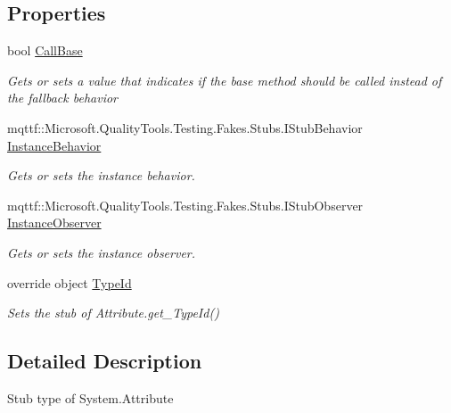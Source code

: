 \subsection*{Properties}
\begin{DoxyCompactItemize}
\item 
bool \hyperlink{class_system_1_1_fakes_1_1_stub_attribute_a31c703e4dd5a586a9bc48fce00b3bd63}{Call\-Base}
\begin{DoxyCompactList}\small\item\em Gets or sets a value that indicates if the base method should be called instead of the fallback behavior\end{DoxyCompactList}\item 
mqttf\-::\-Microsoft.\-Quality\-Tools.\-Testing.\-Fakes.\-Stubs.\-I\-Stub\-Behavior \hyperlink{class_system_1_1_fakes_1_1_stub_attribute_ab325e6620a06934bee8ab027d1e8278a}{Instance\-Behavior}
\begin{DoxyCompactList}\small\item\em Gets or sets the instance behavior.\end{DoxyCompactList}\item 
mqttf\-::\-Microsoft.\-Quality\-Tools.\-Testing.\-Fakes.\-Stubs.\-I\-Stub\-Observer \hyperlink{class_system_1_1_fakes_1_1_stub_attribute_ad7b1b3bf7bc17f79fa63806d190e9450}{Instance\-Observer}
\begin{DoxyCompactList}\small\item\em Gets or sets the instance observer.\end{DoxyCompactList}\item 
override object \hyperlink{class_system_1_1_fakes_1_1_stub_attribute_aa7456d3ca7da1adb85f951ad0e945411}{Type\-Id}
\begin{DoxyCompactList}\small\item\em Sets the stub of Attribute.\-get\-\_\-\-Type\-Id()\end{DoxyCompactList}\end{DoxyCompactItemize}


\subsection{Detailed Description}
Stub type of System.\-Attribute



